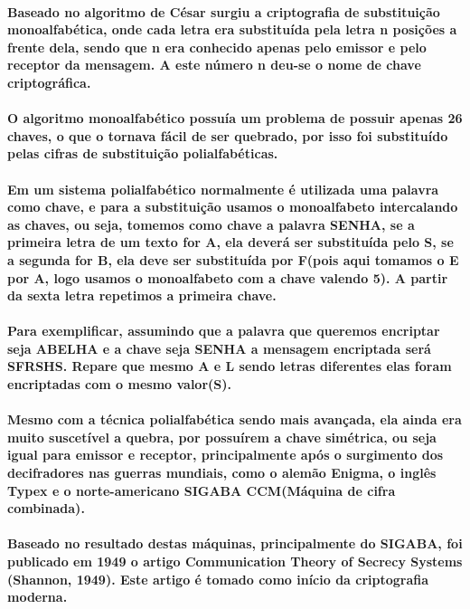 \documentclass{article}
\begin{document}
	\paragraph{
		Baseado no algoritmo de César surgiu a criptografia de substituição monoalfabética, onde cada letra era substituída pela letra n posições a frente dela, sendo que n era conhecido apenas pelo emissor e pelo receptor da mensagem. A este número n deu-se o nome de chave criptográfica.
	}
	\paragraph{
		O algoritmo monoalfabético possuía um problema de possuir apenas 26 chaves, o que o tornava fácil de ser quebrado, por isso foi substituído pelas cifras de substituição polialfabéticas.
	}
	\paragraph{
		Em um sistema polialfabético normalmente é utilizada uma palavra como chave, e para a substituição usamos o monoalfabeto intercalando as chaves, ou seja, tomemos como chave a palavra SENHA, se a primeira letra de um texto for A, ela deverá ser substituída pelo S, se a segunda for B, ela deve ser substituída por F(pois aqui tomamos o E por A, logo usamos o monoalfabeto com a chave valendo 5). A partir da sexta letra repetimos a primeira chave.
	}
	\paragraph{
		Para exemplificar, assumindo que a palavra que queremos encriptar seja ABELHA e a chave seja SENHA a mensagem encriptada será SFRSHS. Repare que mesmo A e L sendo letras diferentes elas foram encriptadas com o mesmo valor(S).
	}
	\paragraph{
		Mesmo com a técnica polialfabética sendo mais avançada, ela ainda era muito suscetível a quebra, por possuírem a chave simétrica, ou seja igual para emissor e receptor, principalmente após o surgimento dos decifradores nas guerras mundiais, como o alemão Enigma, o inglês Typex e o norte-americano SIGABA CCM(Máquina de cifra combinada). 
	}
	\paragraph{
		Baseado no resultado destas máquinas, principalmente do SIGABA, foi publicado em 1949 o artigo Communication Theory of Secrecy Systems (Shannon, 1949). Este artigo é tomado como início da criptografia moderna.
	}
\end{document}
